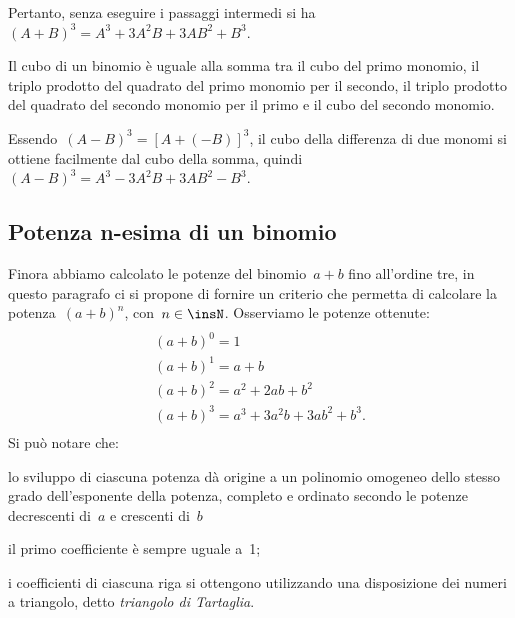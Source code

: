 Pertanto, senza eseguire i passaggi intermedi si ha
$\left(A+B\right)^{3}=A^{3}+3A^{2}B+3{AB}^{2}+B^{3}$.

\osservazione Il cubo di un binomio è uguale alla somma tra il
cubo del primo monomio, il triplo prodotto del quadrato del primo
monomio per il secondo, il triplo prodotto del quadrato del secondo
monomio per il primo e il cubo del secondo monomio.

Essendo~$\left(A-B\right)^{3}=\left[A+\left(-B\right)\right]^{3}$, il
cubo della differenza di due monomi si ottiene facilmente dal cubo
della somma, quindi
$\left(A-B\right)^{3}=A^{3}-3A^{2}B+3{AB}^{2}-B^{3}$.

\vspazio%

\subsection{Potenza n-esima di un binomio}
\label{subsec:11_prodnot_potenzabinomio}

Finora abbiamo calcolato le potenze del binomio~$a+b$ fino
all'ordine tre, in questo paragrafo ci si propone di
fornire un criterio che permetta di calcolare la potenza~$(a+b)^{n}$,
con~$n\in \insN$. Osserviamo le potenze ottenute:
\begin{multline*}
\\(a+b)^{0}=1\\
(a+b)^{1}=a+b\\
(a+b)^{2}=a^{2}+2{ab}+b^{2}\\
(a+b)^{3}=a^{3}+3a^{2}b+3{ab}^{2}+b^{3}.\\
\end{multline*}
Si può notare che:

\begin{itemize*}
\item lo sviluppo di ciascuna potenza dà origine a un polinomio
omogeneo dello stesso grado dell'esponente della
potenza, completo e ordinato secondo le potenze decrescenti di~$a$ e crescenti di~$b$
\item il primo coefficiente è sempre uguale a~1;
\item i coefficienti di ciascuna riga si ottengono utilizzando una
disposizione dei numeri a triangolo, detto \emph{triangolo di Tartaglia}.
\end{itemize*}

\begin{inaccessibleblock}
\begin{minipage}[t]{.49\textwidth}
 \centering 
\end{minipage}
\hfil
 \begin{minipage}[t]{.49\textwidth}
 \centering 
\end{minipage}
\end{inaccessibleblock}

